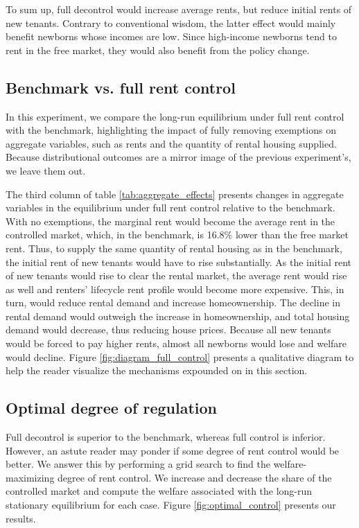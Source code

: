 \documentclass[parskip=full]{article}
\begin{document}
To sum up, full decontrol would increase average rents, but reduce initial rents of new tenants. Contrary to conventional wisdom, the latter effect would mainly benefit newborns whose incomes are low. Since high-income newborns tend to rent in the free market, they would also benefit from the policy change.

\subsection{Benchmark vs. full rent control}\label{subsection:full_control}

In this experiment, we compare the long-run equilibrium under full rent control with the benchmark, highlighting the impact of fully removing exemptions on aggregate variables, such as rents and the quantity of rental housing supplied. Because distributional outcomes are a mirror image of the previous experiment's, we leave them out.

The third column of table \ref{tab:aggregate_effects} presents changes in aggregate variables in the equilibrium under full rent control relative to the benchmark. With no exemptions, the marginal rent would become the average rent in the controlled market, which, in the benchmark, is 16.8\% lower than the free market rent. Thus, to supply the same quantity of rental housing as in the benchmark, the initial rent of new tenants would have to rise substantially. As the initial rent of new tenants would rise to clear the rental market, the average rent would rise as well and renters' lifecycle rent profile would become more expensive. This, in turn, would reduce rental demand and increase homeownership. The decline in rental demand would outweigh the increase in homeownership, and total housing demand would decrease, thus reducing house prices. Because all new tenants would be forced to pay higher rents, almost all newborns would lose and welfare would decline. Figure \ref{fig:diagram_full_control} presents a qualitative diagram to help the reader visualize the mechanisms expounded on in this section. 

\subsection{Optimal degree of regulation}\label{subsection:optimal_control}

Full decontrol is superior to the benchmark, whereas full control is inferior. However, an astute reader may ponder if some degree of rent control would be better. We answer this by performing a grid search to find the welfare-maximizing degree of rent control. We increase and decrease the share of the controlled market and compute the welfare associated with the long-run stationary equilibrium for each case. Figure \ref{fig:optimal_control} presents our results.
\end{document}
